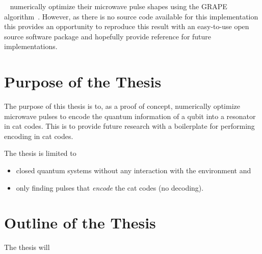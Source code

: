 \documentclass[main.tex]{subfiles}
\begin{document}
~\citeauthor{ofek_extending_2016} numerically optimize their microwave pulse shapes using the GRAPE algorithm~\cite{khaneja_optimal_2005}. However, as there is no source code available for this implementation this provides an opportunity to reproduce this result with an easy-to-use open source software package and hopefully provide reference for future implementations.

\newpage
\section{Purpose of the Thesis}%
\label{sec:purpose}
The purpose of this thesis is to, as a proof of concept, numerically optimize microwave pulses to encode the quantum information of a qubit into a resonator in cat codes.
This is to provide future research with a boilerplate for performing encoding in cat codes.

The thesis is limited to
\begin{itemize}
    \item closed quantum systems without any interaction with the environment and
    \item only finding pulses that \emph{encode} the cat codes (no decoding).
\end{itemize}

\section{Outline of the Thesis}%
\label{sec:outline}
The thesis will 
\end{document}
